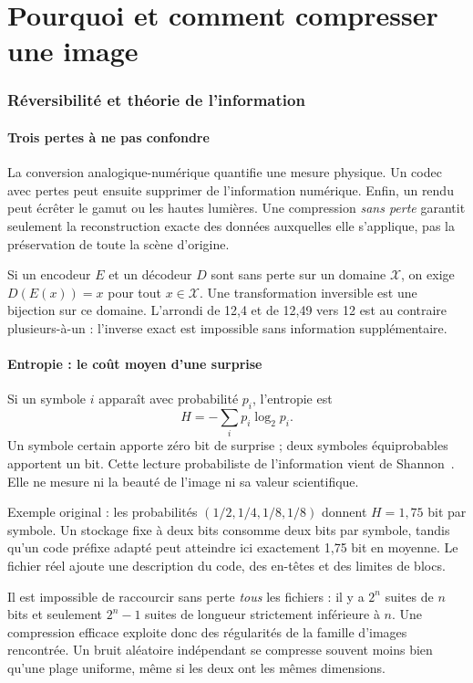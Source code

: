 \part{Pourquoi et comment compresser une image}
\section{Réversibilité et théorie de l'information}
\subsection{Trois pertes à ne pas confondre}
La conversion analogique-numérique quantifie une mesure physique.
Un codec avec pertes peut ensuite supprimer de l'information
numérique. Enfin, un rendu peut écrêter le gamut ou les hautes
lumières. Une compression \emph{sans perte} garantit seulement
la reconstruction exacte des données auxquelles elle s'applique,
pas la préservation de toute la scène d'origine.

Si un encodeur $E$ et un décodeur $D$ sont sans perte sur un domaine
$\mathcal X$, on exige $D(E(x))=x$ pour tout $x\in\mathcal X$.
Une transformation inversible est une bijection sur ce domaine.
L'arrondi de 12,4 et de 12,49 vers 12 est au contraire plusieurs-à-un :
l'inverse exact est impossible sans information supplémentaire.

\subsection{Entropie : le coût moyen d'une surprise}
Si un symbole $i$ apparaît avec probabilité $p_i$, l'entropie est
\begin{equation}
H=-\sum_i p_i\log_2p_i.
\end{equation}
Un symbole certain apporte zéro bit de surprise ; deux symboles
équiprobables apportent un bit. Cette lecture probabiliste de
l'information vient de Shannon~\cite{shannon}. Elle ne mesure
ni la beauté de l'image ni sa valeur scientifique.

Exemple original : les probabilités $(1/2,1/4,1/8,1/8)$ donnent
$H=1{,}75$ bit par symbole. Un stockage fixe à deux bits consomme
deux bits par symbole, tandis qu'un code préfixe adapté peut
atteindre ici exactement 1,75 bit en moyenne. Le fichier réel
ajoute une description du code, des en-têtes et des limites de blocs.

Il est impossible de raccourcir sans perte \emph{tous} les fichiers :
il y a $2^n$ suites de $n$ bits et seulement $2^n-1$ suites de
longueur strictement inférieure à $n$. Une compression efficace
exploite donc des régularités de la famille d'images rencontrée.
Un bruit aléatoire indépendant se compresse souvent moins bien
qu'une plage uniforme, même si les deux ont les mêmes dimensions.

